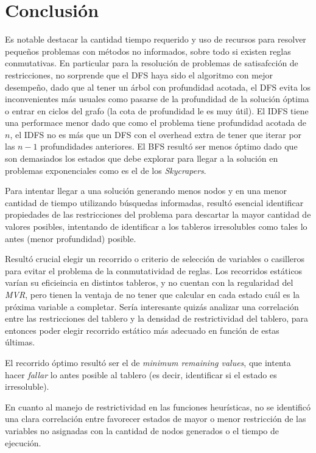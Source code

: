 \documentclass[%
    final,
    reprint,
    notitlepage,
    narroweqnarray,
    inline,
    twoside,
    invited
    ]{ieee}
\begin{document}
\section{Conclusión}

\PARstart Es notable destacar la cantidad tiempo requerido y uso de recursos para resolver pequeños problemas con métodos no informados, sobre todo si existen reglas conmutativas. 
 En particular para la resolución de problemas de satisafcción de restricciones, no sorprende que el DFS haya sido el algoritmo con mejor desempeño, dado que al tener un árbol con profundidad acotada, el DFS evita los inconvenientes más usuales como pasarse de la profundidad de la solución óptima o entrar en ciclos del grafo (la cota de profundidad le es muy útil). El IDFS tiene una performace menor dado que como el problema tiene profundidad acotada de $n$, el IDFS no es más que un DFS con el overhead extra de tener que iterar por las $n-1$ profundidades anteriores. El BFS resultó ser menos óptimo dado que son demasiados los estados que debe explorar para llegar a la solución en problemas exponenciales como es el de los \textit{Skycrapers}. 
\par Para intentar llegar a una solución generando menos nodos y en una menor cantidad de tiempo utilizando búsquedas informadas, resultó esencial identificar 
propiedades de las restricciones del problema para descartar la mayor cantidad de valores posibles, intentando de identificar a los tableros irresolubles como tales 
lo antes (menor profundidad) posible.
\par Resultó crucial elegir un recorrido o criterio de selección de variables o casilleros para evitar el problema de la conmutatividad de reglas. Los 
recorridos estáticos varían su eficieincia en distintos tableros, y no cuentan con la regularidad del \textit{MVR}, pero tienen la ventaja de no 
tener que calcular en cada estado cuál es la próxima variable a completar. Sería interesante quizás analizar una correlación entre las restricciones 
del tablero y la densidad de restrictividad del tablero, para entonces poder elegir recorrido estático más adecuado en función de estas últimas.
\par El recorrido óptimo resultó ser el de \textit{minimum remaining values}, que intenta hacer \textit{fallar} lo antes posible al tablero (es decir, 
identificar si el estado es irresoluble).
\par En cuanto al manejo de restrictividad en las funciones heurísticas, no se identificó una clara correlación entre 
favorecer estados de mayor o menor restricción de las variables no asignadas con la cantidad de nodos generados o el tiempo de ejecución. 
\end{document}
